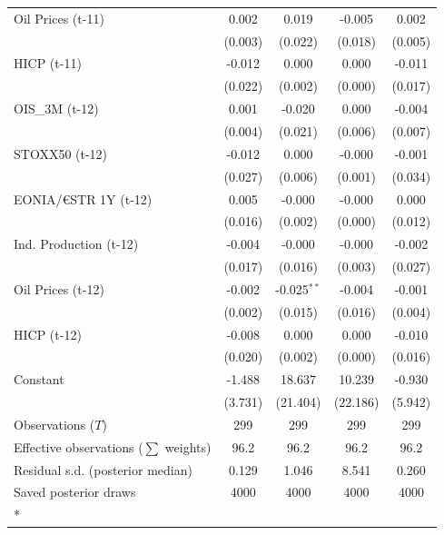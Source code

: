 \begin{longtable}[t]{lcccc}
Oil Prices (t-11) & 0.002 & 0.019 & -0.005 & 0.002\\
 & (0.003) & (0.022) & (0.018) & (0.005)\\
HICP (t-11) & -0.012 & 0.000 & 0.000 & -0.011\\
 & (0.022) & (0.002) & (0.000) & (0.017)\\
OIS\_3M (t-12) & 0.001 & -0.020 & 0.000 & -0.004\\
 & (0.004) & (0.021) & (0.006) & (0.007)\\
STOXX50 (t-12) & -0.012 & 0.000 & -0.000 & -0.001\\
 & (0.027) & (0.006) & (0.001) & (0.034)\\
EONIA/€STR 1Y (t-12) & 0.005 & -0.000 & -0.000 & 0.000\\
 & (0.016) & (0.002) & (0.000) & (0.012)\\
Ind. Production (t-12) & -0.004 & -0.000 & -0.000 & -0.002\\
 & (0.017) & (0.016) & (0.003) & (0.027)\\
Oil Prices (t-12) & -0.002 & -0.025$^{**}$ & -0.004 & -0.001\\
 & (0.002) & (0.015) & (0.016) & (0.004)\\
HICP (t-12) & -0.008 & 0.000 & 0.000 & -0.010\\
 & (0.020) & (0.002) & (0.000) & (0.016)\\
Constant & -1.488 & 18.637 & 10.239 & -0.930\\
 & (3.731) & (21.404) & (22.186) & (5.942)\\
\midrule
Observations ($T$) & 299 & 299 & 299 & 299\\
Effective observations ($\sum$ weights) & 96.2 & 96.2 & 96.2 & 96.2\\
Residual s.d. (posterior median) & 0.129 & 1.046 & 8.541 & 0.260\\
Saved posterior draws & 4000 & 4000 & 4000 & 4000\\*
\end{longtable}
\endgroup{}

